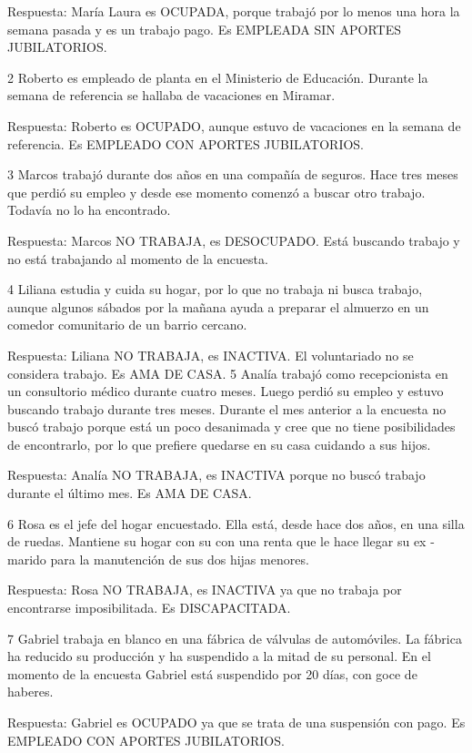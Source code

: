 \documentclass[
  openany]{book}
\begin{document}
Respuesta: María Laura es OCUPADA, porque trabajó por lo menos una hora la semana pasada y es un trabajo pago. Es EMPLEADA SIN APORTES JUBILATORIOS.

2 Roberto es empleado de planta en el Ministerio de Educación. Durante la semana de referencia se hallaba de vacaciones en Miramar.

Respuesta: Roberto es OCUPADO, aunque estuvo de vacaciones en la semana de referencia. Es EMPLEADO CON APORTES JUBILATORIOS.

3 Marcos trabajó durante dos años en una compañía de seguros. Hace tres meses que perdió su empleo y desde ese momento comenzó a buscar otro trabajo. Todavía no lo ha encontrado.

Respuesta: Marcos NO TRABAJA, es DESOCUPADO. Está buscando trabajo y no está trabajando al momento de la encuesta.

4 Liliana estudia y cuida su hogar, por lo que no trabaja ni busca trabajo, aunque algunos sábados por la mañana ayuda a preparar el almuerzo en un comedor comunitario de un barrio cercano.

Respuesta: Liliana NO TRABAJA, es INACTIVA. El voluntariado no se considera trabajo. Es AMA DE CASA. 5 Analía trabajó como recepcionista en un consultorio médico durante cuatro meses. Luego perdió su empleo y estuvo buscando trabajo durante tres meses. Durante el mes anterior a la encuesta no buscó trabajo porque está un poco desanimada y cree que no tiene posibilidades de encontrarlo, por lo que prefiere quedarse en su casa cuidando a sus hijos.

Respuesta: Analía NO TRABAJA, es INACTIVA porque no buscó trabajo durante el último mes. Es AMA DE CASA.

6 Rosa es el jefe del hogar encuestado. Ella está, desde hace dos años, en una silla de ruedas. Mantiene su hogar con su con una renta que le hace llegar su ex - marido para la manutención de sus dos hijas menores.

Respuesta: Rosa NO TRABAJA, es INACTIVA ya que no trabaja por encontrarse imposibilitada. Es DISCAPACITADA.

7 Gabriel trabaja en blanco en una fábrica de válvulas de automóviles. La fábrica ha reducido su producción y ha suspendido a la mitad de su personal. En el momento de la encuesta Gabriel está suspendido por 20 días, con goce de haberes.

Respuesta: Gabriel es OCUPADO ya que se trata de una suspensión con pago. Es EMPLEADO CON APORTES JUBILATORIOS.
\end{document}
